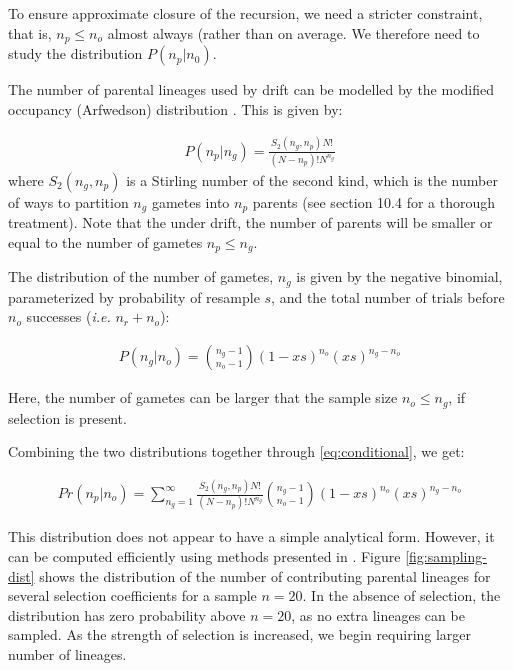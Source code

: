 \documentclass[review]{elsarticle}
\begin{document}
To ensure approximate closure of the recursion, we need a stricter constraint, that is, $n_p\leq n_o$
 almost always (rather than on average. We therefore need to study the distribution $P(n_p|n_0)$. 

The number of parental lineages used by drift can be modelled by the modified occupancy
(Arfwedson) distribution \citep{Wakeley2009,ONeill2019,JohnsonEtAl2005}. This is given by:

\begin{align}
  \label{eq:occupancy}
  P(n_p|n_g) = \frac{S_2(n_g,n_p) N!}{(N-n_p)! N^{n_g}}
\end{align}
where $S_2(n_g,n_p)$ is a Stirling number of the second kind, which is the number of ways to partition
$n_g$ gametes into $n_p$ parents (see \cite{JohnsonEtAl2005} section 10.4 for a thorough treatment).
Note that the under drift, the number of parents will be smaller or equal to the number of gametes
$n_p \le n_g$.

The distribution of the number of gametes, $n_g$ is given by the negative binomial, parameterized by
probability of resample $s$, and the total number of trials before $n_o$ successes (\textit{i.e.}
$n_r+n_o$):

\begin{align}
  \label{eq:neg-binomial-trials}
  P(n_g|n_o) = \binom{n_g-1}{n_o-1}(1-xs)^{n_o}(xs)^{n_g-n_o}
\end{align}

Here, the number of gametes can be larger that the sample size $n_o \le n_g$, if selection is present.

Combining the two distributions together through \ref{eq:conditional}, we get:

\begin{align}
  \label{eq:lineages-in-past}
   Pr(n_p|n_o) = \sum_{n_g=1}^{\infty} \frac{S_2(n_g,n_p) N!}{(N-n_p)! N^{n_g}} \binom{n_g-1}{n_o-1}(1-xs)^{n_o}(xs)^{n_g-n_o}
\end{align}

This distribution does not appear to have a simple analytical form. However, it can be computed
efficiently using methods presented in \citep{ONeill2019}. Figure \ref{fig:sampling-dist} shows the
distribution of the number of contributing parental lineages for several selection coefficients for
a sample $n=20$. In the absence of selection, the distribution has zero probability above $n=20$, as
no extra lineages can be sampled. As the strength of selection is increased, we begin requiring
larger number of lineages.
\end{document}
